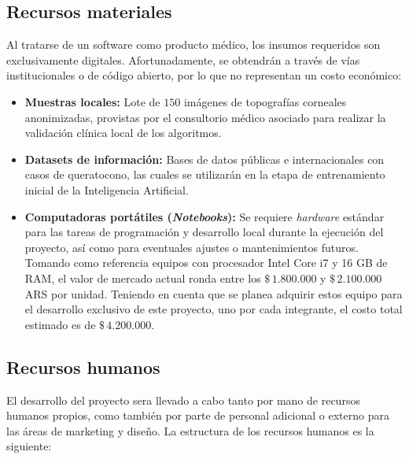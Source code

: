         \subsection{Recursos materiales}

            Al tratarse de un software como producto médico, los insumos requeridos son exclusivamente digitales. Afortunadamente, se obtendrán a través de vías institucionales o de código abierto, por lo que no representan un costo económico:

            \begin{itemize}
                \item \textbf{Muestras locales:} Lote de $150$ imágenes de topografías corneales anonimizadas, provistas por el consultorio médico asociado para realizar la validación clínica local de los algoritmos.
    
                \item \textbf{Datasets de información:} Bases de datos públicas e internacionales con casos de queratocono, las cuales se utilizarán en la etapa de entrenamiento inicial de la Inteligencia Artificial.
            \end{itemize}

            \begin{itemize}
                \item \textbf{Computadoras portátiles (\textit{Notebooks}):} Se requiere \textit{hardware} estándar para las tareas de programación y desarrollo local durante la ejecución del proyecto, así como para eventuales ajustes o mantenimientos futuros. Tomando como referencia equipos con procesador Intel Core i7 y 16 GB de RAM, el valor de mercado actual ronda entre los $\$\,1.800.000$ y $\$\,2.100.000$ ARS por unidad. Teniendo en cuenta que se planea adquirir estos equipo para el desarrollo exclusivo de este proyecto, uno por cada integrante, el costo total estimado es de $\$\,4.200.000$.
            \end{itemize}

        \subsection{Recursos humanos}

            El desarrollo del proyecto sera llevado a cabo tanto por mano de recursos humanos propios, como también por parte de personal adicional o externo para las áreas de marketing y diseño. La estructura de los recursos humanos es la siguiente:
    
